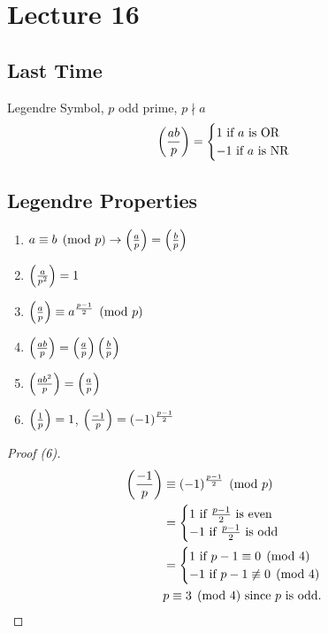 \chapter{Lecture 16}
\date{October 22, 2024}

\section{Last Time}
    Legendre Symbol, $p$ odd prime, $p\nmid a$
    \[
        \left( \frac{ab}{p} \right)  = 
        \begin{cases}
            1 \text{ if } a \text{ is OR} \\
            -1 \text{ if } a \text{ is NR}  
        \end{cases}
    \]
\section{Legendre Properties}
    \begin{enumerate}
        \item $a\equiv b\pmod{p} \rightarrow \left( \frac{a}{p} \right)  = \left( \frac{b}{p} \right) $
        \item $\left( \frac{a}{p^2} \right)  = 1$
        \item $\left( \frac{a}{p} \right) \equiv a^{\frac{p-1}{2}}\pmod{p}$
        \item $\left( \frac{ab}{p} \right)  = \left( \frac{a}{p} \right) \left( \frac{b}{p} \right) $
        \item $\left( \frac{ab^2}{p} \right)  = \left( \frac{a}{p} \right) $
        \item $\left( \frac{1}{p} \right)  = 1$, $\left( \frac{-1}{p} \right)  = (-1)^{\frac{p-1}{2}}$
    \end{enumerate}
    \begin{proof} [Proof (6)]
        \begin{align*}
            \left( \frac{-1}{p} \right)  &\equiv (-1)^{\frac{p-1}{2}}\pmod{p} \\
            &= \begin{cases}
                1 \text{ if }\frac{p-1}{2} \text{ is even} \\
                -1 \text{ if }\frac{p-1}{2} \text{ is odd} 
            \end{cases} \\
            &= \begin{cases}
                1 \text{ if } p-1\equiv 0\pmod{4} \\
                -1 \text{ if }p-1\not\equiv 0\pmod{4}
            \end{cases} \\
            & p\equiv 3\pmod{4} \text{ since } p \text{ is odd.}
        \end{align*}
    \end{proof}
    
